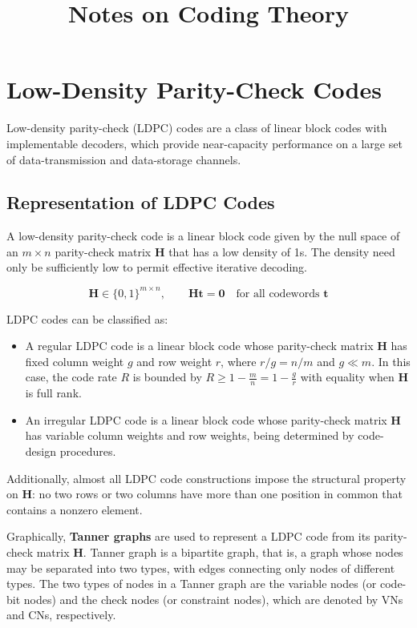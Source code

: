 \documentclass[11pt]{article}
\begin{document}
\title{Notes on Coding Theory}
\author{}
\date{}
\maketitle

\clearpage
\section{Low-Density Parity-Check Codes}

Low-density parity-check (LDPC) codes are a class of linear block codes with implementable decoders, which provide near-capacity performance on a large set of data-transmission and data-storage channels.

\subsection{Representation of LDPC Codes}

A low-density parity-check code is a linear block code given by the null space of an $m \times n$ parity-check matrix \textbf{H} that has a low density of 1s. The density need only be sufficiently low to permit effective iterative decoding.

\[
    \mathbf{H} \in \{0,1\}^{m \times n}, \qquad \mathbf{H}\mathbf{t} = \mathbf{0} \quad \text{for all codewords } \mathbf{t}
\]

LDPC codes can be classified as:
\begin{itemize}
  \item A regular LDPC code is a linear block code whose parity-check matrix \textbf{H} has fixed column weight $g$ and row weight $r$, where $r/g = n/m$ and $g \ll m$. In this case, the code rate $R$ is bounded by $R \geq 1 - \frac{m}{n} = 1 - \frac{g}{r}$ with equality when \textbf{H} is full rank.
  \item An irregular LDPC code is a linear block code whose parity-check matrix \textbf{H} has variable column weights and row weights, being determined by code-design procedures.
\end{itemize}

\noindent Additionally, almost all LDPC code constructions impose the structural property on \textbf{H}: no two rows or two columns have more than one position in common that contains a nonzero element.

Graphically, \textbf{Tanner graphs} are used to represent a LDPC code from its parity-check matrix \textbf{H}. Tanner graph is a bipartite graph, that is, a graph whose nodes may be separated into two types, with edges connecting only nodes of different types. The two types of nodes in a Tanner graph are the variable nodes (or code-bit nodes) and the check nodes (or constraint nodes), which are denoted by VNs and CNs, respectively.
\end{document}
